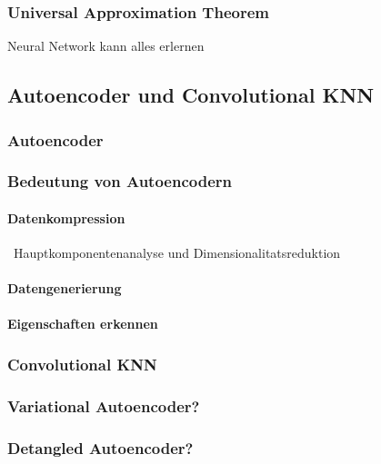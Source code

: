 \documentclass[../main]{subfiles}
\begin{document}
\subsubsection{Universal Approximation Theorem}\label{sec:UAT}
Neural Network kann alles erlernen

\subsection{Autoencoder und Convolutional KNN}
\subsubsection{Autoencoder}
\subsubsection{Bedeutung von Autoencodern}
\paragraph{Datenkompression}
~Hauptkomponentenanalyse und Dimensionalitatsreduktion
\paragraph{Datengenerierung}
\paragraph{Eigenschaften erkennen}

\subsubsection{Convolutional KNN}

\subsubsection{Variational Autoencoder?}
\subsubsection{Detangled Autoencoder?}
\end{document}
